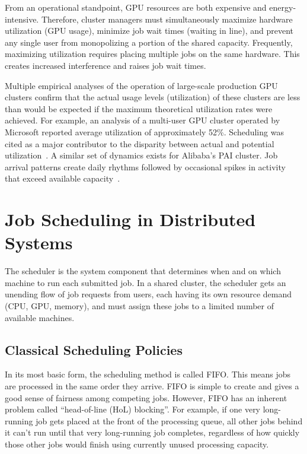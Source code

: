 From an operational standpoint, GPU resources are both expensive and energy-intensive. Therefore, cluster managers must simultaneously maximize hardware utilization (GPU usage), minimize job wait times (waiting in line), and prevent any single user from monopolizing a portion of the shared capacity. Frequently, maximizing utilization requires placing multiple jobs on the same hardware. This creates increased interference and raises job wait times.

Multiple empirical analyses of the operation of large-scale production GPU clusters confirm that the actual usage levels (utilization) of these clusters are less than would be expected if the maximum theoretical utilization rates were achieved. For example, an analysis of a multi-user GPU cluster operated by Microsoft reported average utilization of approximately 52\%. Scheduling was cited as a major contributor to the disparity between actual and potential utilization~\cite{jeon2019analysis}. A similar set of dynamics exists for Alibaba's PAI cluster. Job arrival patterns create daily rhythms followed by occasional spikes in activity that exceed available capacity~\cite{weng2022mlaas}.

\section{Job Scheduling in Distributed Systems}
\label{sec:scheduling}

The scheduler is the system component that determines when and on which machine to run each submitted job. In a shared cluster, the scheduler gets an unending flow of job requests from users, each having its own resource demand (CPU, GPU, memory), and must assign these jobs to a limited number of available machines.

\subsection{Classical Scheduling Policies}

In its most basic form, the scheduling method is called FIFO. This means jobs are processed in the same order they arrive. FIFO is simple to create and gives a good sense of fairness among competing jobs. However, FIFO has an inherent problem called ``head-of-line (HoL) blocking''. For example, if one very long-running job gets placed at the front of the processing queue, all other jobs behind it can't run until that very long-running job completes, regardless of how quickly those other jobs would finish using currently unused processing capacity.

